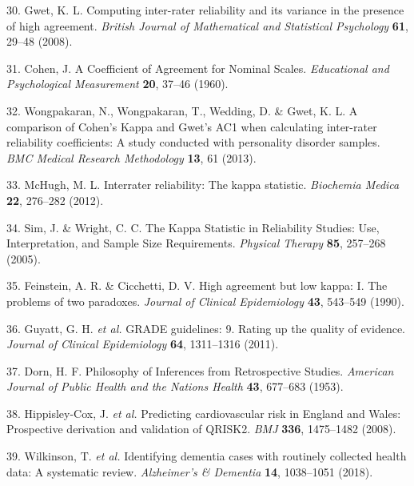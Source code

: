 \documentclass[a4paper, twoside]{templates/ociamthesis}
\begin{document}
\leavevmode\hypertarget{ref-gwet2008}{}%
30. Gwet, K. L. Computing inter-rater reliability and its variance in the presence of high agreement. \emph{British Journal of Mathematical and Statistical Psychology} \textbf{61}, 29--48 (2008).

\leavevmode\hypertarget{ref-cohen1960}{}%
31. Cohen, J. A Coefficient of Agreement for Nominal Scales. \emph{Educational and Psychological Measurement} \textbf{20}, 37--46 (1960).

\leavevmode\hypertarget{ref-wongpakaran2013}{}%
32. Wongpakaran, N., Wongpakaran, T., Wedding, D. \& Gwet, K. L. A comparison of Cohen's Kappa and Gwet's AC1 when calculating inter-rater reliability coefficients: A study conducted with personality disorder samples. \emph{BMC Medical Research Methodology} \textbf{13}, 61 (2013).

\leavevmode\hypertarget{ref-mchugh2012}{}%
33. McHugh, M. L. Interrater reliability: The kappa statistic. \emph{Biochemia Medica} \textbf{22}, 276--282 (2012).

\leavevmode\hypertarget{ref-sim2005}{}%
34. Sim, J. \& Wright, C. C. The Kappa Statistic in Reliability Studies: Use, Interpretation, and Sample Size Requirements. \emph{Physical Therapy} \textbf{85}, 257--268 (2005).

\leavevmode\hypertarget{ref-feinstein1990}{}%
35. Feinstein, A. R. \& Cicchetti, D. V. High agreement but low kappa: I. The problems of two paradoxes. \emph{Journal of Clinical Epidemiology} \textbf{43}, 543--549 (1990).

\leavevmode\hypertarget{ref-guyatt2011}{}%
36. Guyatt, G. H. \emph{et al.} GRADE guidelines: 9. Rating up the quality of evidence. \emph{Journal of Clinical Epidemiology} \textbf{64}, 1311--1316 (2011).

\leavevmode\hypertarget{ref-dorn1953}{}%
37. Dorn, H. F. Philosophy of Inferences from Retrospective Studies. \emph{American Journal of Public Health and the Nations Health} \textbf{43}, 677--683 (1953).

\leavevmode\hypertarget{ref-hippisley-cox2008}{}%
38. Hippisley-Cox, J. \emph{et al.} Predicting cardiovascular risk in England and Wales: Prospective derivation and validation of QRISK2. \emph{BMJ} \textbf{336}, 1475--1482 (2008).

\leavevmode\hypertarget{ref-wilkinson2018a}{}%
39. Wilkinson, T. \emph{et al.} Identifying dementia cases with routinely collected health data: A systematic review. \emph{Alzheimer's \& Dementia} \textbf{14}, 1038--1051 (2018).
\end{document}
